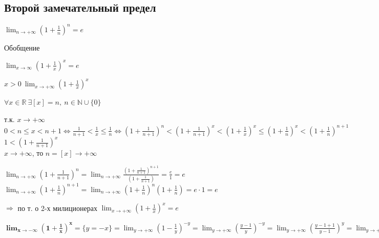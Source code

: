 \documentclass{article}
\begin{document}
    \subsection{Второй замечательный предел}
    
    \( \lim_{n \to +\infty} (1 + \frac{1}{n})^n = e \)

    Обобщение

    \(\lim_{x \to \infty} (1 + \frac{1}{x})^x = e\)

    \( x > 0\ \lim_{x \to +\infty} (1 + \frac{1}{x})^x \)

    \(\forall x \in \mathbb{R}\ \exists [x] = n,\ n \in \mathbb{N} \cup \{ 0 \} \)

    т.к. \( x \to +\infty \)\\
    \( 0 < n \leq x < n + 1 \Leftrightarrow \frac{1}{n + 1} < \frac{1}{x} \leq \frac{1}{n} \Leftrightarrow (1 + \frac{1}{n + 1})^n < (1 + \frac{1}{n + 1})^x < (1 + \frac{1}{x})^x \leq (1 + \frac{1}{n})^x < (1 + \frac{1}{n})^{n + 1} \)\\
    \( 1 < (1 + \frac{1}{n + 1})^x \)\\
    \( x \to +\infty \), то \( n = [x] \to +\infty \)
    
    \( \lim_{n \to +\infty}(1 + \frac{1}{n + 1})^n = \lim_{n \to +\infty}\frac{(1 + \frac{1}{n + 1})^{n + 1}}{(1 + \frac{1}{n + 1})} = \frac{e}{1} = e \)\\    
    \(\lim_{n \to +\infty}(1 + \frac{1}{n})^{n+1} = \lim_{n \to +\infty}(1+\frac{1}{n})^n(1+\frac{1}{n}) = e \cdot 1 = e\)

    \(\Rightarrow\) по т. о 2-х милиционерах \(\lim_{x \to +\infty}(1 + \frac{1}{x})^x = e\)

    \(\mathbf{\lim_{x \to -\infty}(1 + \frac{1}{x})^x} = \{ y = -x \} = \lim_{y \to +\infty}(1 - \frac{1}{y})^{-y} = \lim_{y \to +\infty}(\frac{y - 1}{y})^{-y} = \lim_{y \to +\infty}(\frac{y - 1 + 1}{y - 1})^y = \lim_{y \to +\infty}(1 + \frac{1}{y - 1})^y = \lim_{y \to +\infty}(1 + \frac{1}{y - 1})^{y - 1}(1 + \frac{1}{y - 1}) = e(1 + 0) = e \)
    
\end{document}
